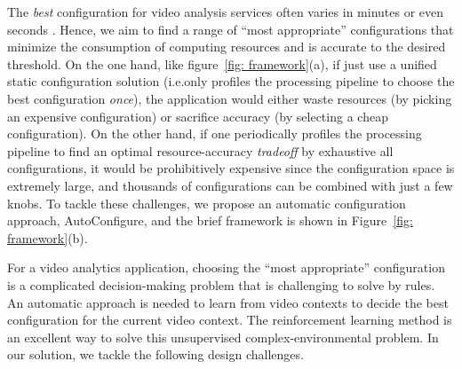 %

The \emph{best} configuration for video analysis services often varies in minutes or even seconds \cite{jiang2018chameleon}.
Hence, we aim to find a range of ``most appropriate'' configurations that %
minimize the consumption of computing resources and is accurate to the desired threshold. On the one hand, like figure~\ref{fig: framework}(a), if just use a unified static configuration solution (i.e.only profiles the processing pipeline to choose the best configuration \emph{once}), the application would either waste resources (by picking an expensive configuration) or sacrifice accuracy (by selecting a cheap configuration). On the other hand, if one periodically profiles the processing pipeline to find an optimal resource-accuracy \emph{tradeoff} by exhaustive all configurations, it would be prohibitively expensive since the configuration space is extremely large, and thousands of configurations can be combined with just a few knobs. To tackle these challenges, we propose an automatic configuration approach, AutoConfigure, and the brief framework is shown in Figure~\ref{fig: framework}(b).


For a video analytics application, choosing the ``most appropriate'' configuration is a complicated decision-making problem that is challenging to solve by rules. An automatic approach is needed to learn from video contexts to decide the best configuration for the current video context. The reinforcement learning method is an excellent way to solve this unsupervised complex-environmental problem. In our solution, we tackle the following design challenges.



